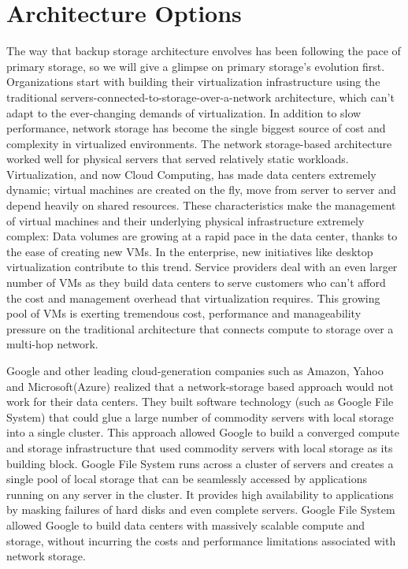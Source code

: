 \section{Architecture Options} 
\label{back:arch}
The way that backup storage architecture envolves has been following the pace of
primary storage, so we will give a glimpse on primary storage's evolution first.
Organizations start with building their virtualization infrastructure using the
traditional servers-connected-to-storage-over-a-network architecture, which
can’t adapt to the ever-changing demands of virtualization. In addition to slow
performance, network storage has become the single biggest source of cost and
complexity in virtualized environments. The network storage-based architecture
worked well for physical servers that served relatively static workloads.
Virtualization, and now Cloud Computing, has made data centers extremely
dynamic\cite{berkeleycloud09}; virtual machines are created on the fly, move from server to server and
depend heavily on shared resources. These characteristics make the management
of virtual machines and their underlying physical infrastructure extremely
complex: Data volumes are growing at a rapid pace in the data center, thanks to the ease
of creating new VMs. In the enterprise, new initiatives like desktop virtualization
contribute to this trend. Service providers deal with an even larger number of
VMs as they build data centers to serve customers who can’t afford the cost
and management overhead that virtualization requires. This growing pool of
VMs is exerting tremendous cost, performance and manageability pressure on
the traditional architecture that connects compute to storage over a multi-hop
network.

Google\cite{googlefs03} and other leading cloud-generation companies such as Amazon, Yahoo
and Microsoft(Azure)\cite{azure} realized that a network-storage based approach would
not work for their data centers. They built software technology (such as Google
File System) that could glue a large number of commodity servers with local
storage into a single cluster. This approach allowed Google to build a converged
compute and storage infrastructure that used commodity servers with local
storage as its building block\cite{deconstructing05}. Google File System runs across a cluster of servers
and creates a single pool of local storage that can be seamlessly accessed by
applications running on any server in the cluster. It provides high availability
to applications by masking failures of hard disks and even complete servers.
Google File System allowed Google to build data centers with massively scalable
compute and storage, without incurring the costs and performance limitations
associated with network storage.

